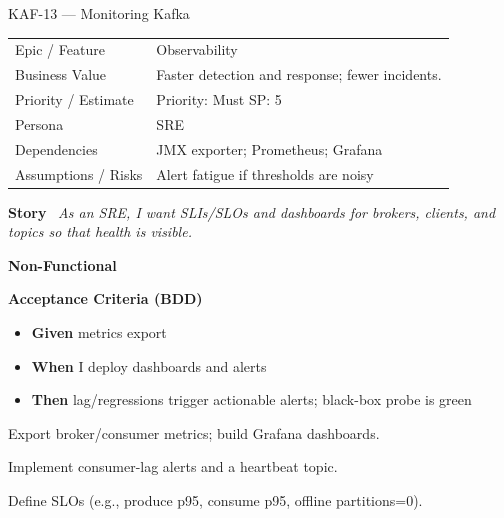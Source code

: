 \documentclass[11pt,a4paper]{article}
\newcommand{\Field}[2]{\textbf{#1}~#2}
\begin{document}
\begin{StoryCardBox}{KAF-13 --- Monitoring Kafka}
\begin{tabularx}{\linewidth}{LY}
 Epic / Feature & Observability \\
 Business Value & Faster detection and response; fewer incidents. \\
 Priority / Estimate & Priority: Must \quad SP: 5 \\
 Persona & SRE \\
 Dependencies & JMX exporter; Prometheus; Grafana \\
 Assumptions / Risks & Alert fatigue if thresholds are noisy \\
\end{tabularx}

\medskip
\Field{Story}{\; \emph{As an SRE, I want SLIs/SLOs and dashboards for brokers, clients, and topics so that health is visible.}}

\medskip
\Field{Non-Functional}{\; \; }

\medskip
\Field{Acceptance Criteria (BDD)}{}
\begin{itemize}[leftmargin=1.2em, itemsep=1pt]
  \item \textbf{Given} metrics export
  \item \textbf{When} I deploy dashboards and alerts
  \item \textbf{Then} lag/regressions trigger actionable alerts; black-box probe is green
\end{itemize}

\begin{TasksBox}
\begin{tasklist}
  \item Export broker/consumer metrics; build Grafana dashboards.
  \item Implement consumer-lag alerts and a heartbeat topic.
  \item Define SLOs (e.g., produce p95, consume p95, offline partitions=0).
\end{tasklist}
\end{TasksBox}
\end{StoryCardBox}
\clearpage
\end{document}
